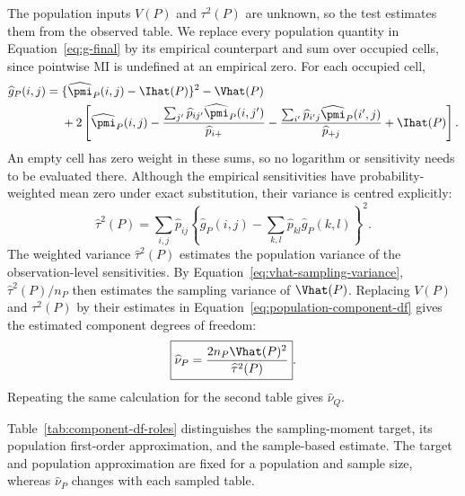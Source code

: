 The population inputs \(V(P)\) and \(\tau^2(P)\) are unknown, so the
test estimates them from the observed table. We replace every population
quantity in Equation~\eqref{eq:g-final} by its empirical counterpart and sum over
occupied cells, since pointwise MI is undefined at an empirical zero.
For each occupied cell,
\begin{equation}
\begin{aligned}
\widehat g_P(i,j)
={}&\{\widehat\pmi_P(i,j)-\Ihat(P)\}^2-\Vhat(P)\\
&+2\left[
\widehat\pmi_P(i,j)
-\frac{\sum_{j'}\widehat p_{ij'}\widehat\pmi_P(i,j')}
       {\widehat p_{i+}}
-\frac{\sum_{i'}\widehat p_{i'j}\widehat\pmi_P(i',j)}
       {\widehat p_{+j}}
+\Ihat(P)
\right].
\end{aligned}
\label{eq:g-hat}
\end{equation}
An empty cell has zero weight in these sums, so no logarithm or sensitivity
needs to be evaluated there. Although the empirical sensitivities have
probability-weighted mean zero under exact substitution, their variance
is centred explicitly:
\begin{equation}
  \widehat\tau^2(P)
  =\sum_{i,j}\widehat p_{ij}
  \left\{\widehat g_P(i,j)
  -\sum_{k,l}\widehat p_{kl}\widehat g_P(k,l)\right\}^2.
  \label{eq:tau-hat}
\end{equation}
The weighted variance \(\widehat\tau^2(P)\) estimates the population
variance of the observation-level sensitivities. By
Equation~\eqref{eq:vhat-sampling-variance}, \(\widehat\tau^2(P)/n_P\)
then estimates the sampling variance of \(\Vhat(P)\). Replacing \(V(P)\) and
\(\tau^2(P)\) by their estimates in
Equation~\eqref{eq:population-component-df} gives the estimated component
degrees of freedom:
\begin{equation}
  \boxed{
  \widehat\nu_P
  =\frac{2n_P\Vhat(P)^2}{\widehat\tau^2(P)}
  }.
  \label{eq:nu-p-hat}
\end{equation}
Repeating the same calculation for the second table gives
\(\widehat\nu_Q\).

\medskip
Table~\ref{tab:component-df-roles} distinguishes the sampling-moment target,
its population first-order approximation, and the sample-based estimate.
The target and population approximation are fixed for a population and
sample size, whereas \(\widehat\nu_P\) changes with each sampled table.

